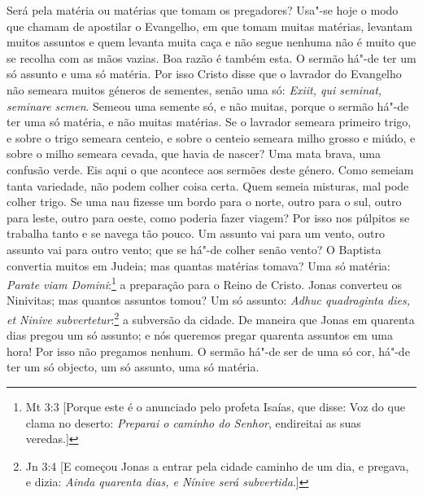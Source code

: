 Será pela matéria ou matérias que tomam os pregadores? Usa"-se hoje o
modo que chamam de apostilar o Evangelho, em que tomam muitas matérias,
levantam muitos assuntos e quem levanta muita caça e não segue nenhuma
não é muito que se recolha com as mãos vazias. Boa razão é também esta.
O sermão há"-de ter um só assunto e uma só matéria. Por isso Cristo disse
que o lavrador do Evangelho não semeara muitos géneros de sementes,
senão uma só: \emph{Exiit, qui seminat, seminare semen}. Semeou uma
semente só, e não muitas, porque o sermão há"-de ter uma só matéria, e
não muitas matérias. Se o lavrador semeara primeiro trigo, e sobre o
trigo semeara centeio, e sobre o centeio semeara milho grosso e miúdo, e
sobre o milho semeara cevada, que havia de nascer? Uma mata brava,
uma confusão verde. Eis aqui o que acontece aos sermões deste género.
Como semeiam tanta variedade, não podem colher coisa certa. Quem semeia
misturas, mal pode colher trigo. Se uma nau fizesse um bordo para o
norte, outro para o sul, outro para leste, outro para oeste, como
poderia fazer viagem? Por isso nos púlpitos se trabalha tanto e se
navega tão pouco. Um assunto vai para um vento, outro assunto vai para
outro vento; que se há"-de colher senão vento? O Baptista convertia
muitos em Judeia; mas quantas matérias tomava? Uma só matéria:
\emph{Parate viam Domini}:\footnote{Mt 3:3 [Porque este é o anunciado pelo profeta Isaías, que disse: Voz do que clama no deserto: \emph{Preparai o caminho do Senhor}, endireitai as suas veredas.]} a preparação para o Reino de Cristo. Jonas
converteu os Ninivitas; mas quantos assuntos tomou? Um só assunto:
\emph{Adhuc quadraginta dies, et Ninive subvertetur}:\footnote{Jn 3:4 [E começou Jonas a entrar pela cidade caminho de um dia, e pregava, e dizia: \emph{Ainda quarenta dias, e Nínive será subvertida}.]} a subversão da
cidade. De maneira que Jonas em quarenta dias pregou um só assunto; e
nós queremos pregar quarenta assuntos em uma hora! Por isso não pregamos
nenhum. O sermão há"-de ser de uma só cor, há"-de ter um só objecto, um só
assunto, uma só matéria.


